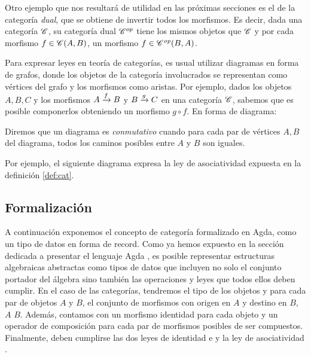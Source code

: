\begin{example} \label{ex:op}
Otro ejemplo que nos resultará de utilidad en las próximas secciones es el de la categoría {\it dual}, que se obtiene de invertir todos los morfismos. Es decir, dada una categoría $\C$, su categoría dual $\C^{op}$ tiene los mismos objetos que $\C$ y por cada morfismo $f \in \Hom{A}{B}{\C}$, un morfismo $f \in \Hom{B}{A}{\C^{op}}$.
\end{example}

\hspace{1ex}
Para expresar leyes en teoría de categorías, es usual utilizar diagramas en forma de grafos, donde los objetos de la categoría involucrados se representan como vértices del grafo y los morfismos como aristas. Por ejemplo, dados los objetos $A,B,C$ y los morfismos $\flecha{A}{f}{B}$ y $\flecha{B}{g}{C}$ en una categoría $\C$, sabemos que es posible componerlos obteniendo un morfismo $g \circ f$. En forma de diagrama:

  \begin{center}
  \xymatrixcolsep{3pc} \xymatrixrowsep{3pc}
  \centerline{}
  \end{center}

  Diremos que un diagrama es {\it conmutativo} cuando para cada par de vértices $A, B$ del diagrama, todos los caminos posibles entre $A$ y $B$ son iguales.

  Por ejemplo, el siguiente diagrama expresa la ley de asociatividad expuesta en la definición \ref{def:cat}.

  \begin{center}
  \xymatrixcolsep{3pc} \xymatrixrowsep{3pc}
  \centerline{}
  \end{center}

\subsection{Formalización}
A continuación exponemos el concepto de categoría formalizado en Agda, como un tipo de datos en forma de record.  
Como ya hemos expuesto en la sección dedicada a presentar el lenguaje Agda%
, es posible representar estructuras algebraicas abstractas como tipos de datos que incluyen no solo el conjunto portador del álgebra sino también las operaciones y leyes que todos ellos deben cumplir. En el caso de las categorías, tendremos el tipo de los objetos  y para cada par de objetos $A$ y $B$, el conjunto de morfismos con origen en $A$ y destino en $B$,  $A$ $B$. Además, contamos con un morfismo identidad  para cada objeto y un operador de composición para cada par de morfismos posibles de ser compuestos. Finalmente, deben cumplirse las dos leyes de identidad  e  y la ley de asociatividad .

